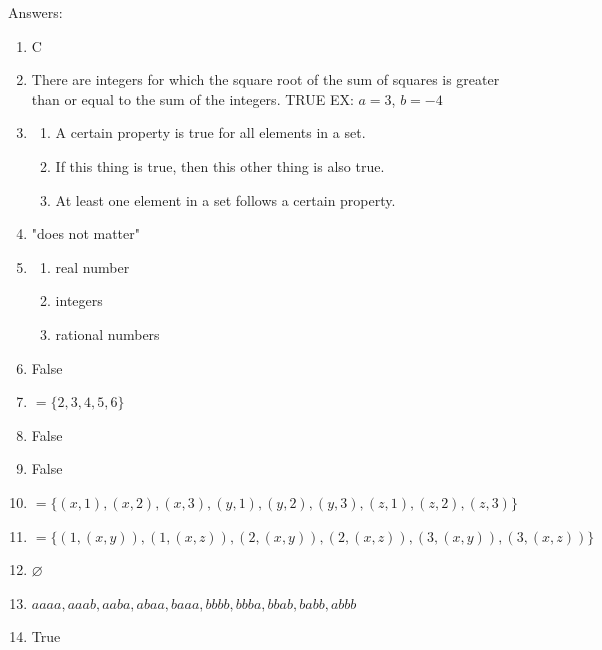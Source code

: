\documentclass[letterpaper]{article}
\begin{document}
    \noindent Answers:
    \begin{enumerate}
        \item C
        
        \item There are integers for which the square root of the sum of squares is greater than or equal to the sum of the integers. TRUE EX: $a=3$, $b=-4$
        
        \item\begin{enumerate}
            \item A certain property is true for all elements in a set.
            \item If this thing is true, then this other thing is also true.
            \item At least one element in a set follows a certain property.
        \end{enumerate}

        \item "does not matter"

        \item\begin{enumerate}
            \item real number
            \item integers
            \item rational numbers
        \end{enumerate}

        \item False

        \item $=\{2,3,4,5,6\}$

        \item False

        \item False

        \item $=\{(x,1),(x,2),(x,3),(y,1),(y,2),(y,3),(z,1),(z,2),(z,3)\}$

        \item $=\{(1,(x,y)),(1,(x,z)),(2,(x,y)),(2,(x,z)),(3,(x,y)),(3,(x,z))\}$

        \item $\varnothing$

        \item $aaaa,aaab,aaba,abaa,baaa,bbbb,bbba,bbab,babb,abbb$

        \item True
        
    \end{enumerate}
\end{document}
